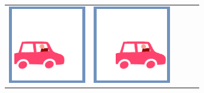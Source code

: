 \documentclass[12pt, a4paper]{article}
\begin{document}
\begin{minipage}{\textwidth}
\begin{table}[H]
\begin{tabulary}{\linewidth}{|C|CCCC|}
				\vspace{0.01cm}\includegraphics[width=\linewidth]{option2} &
				\vspace{0.01cm}\includegraphics[width=\linewidth]{option3} &

\end{tabulary}
\end{table}
\end{minipage}
\end{document}
